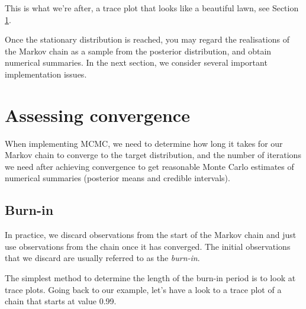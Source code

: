 \documentclass[
  12pt,
]{krantz}
\begin{document}
This is what we're after, a trace plot that looks like a beautiful lawn, see Section \ref{convergence-diag}.

Once the stationary distribution is reached, you may regard the realisations of the Markov chain as a sample from the posterior distribution, and obtain numerical summaries. In the next section, we consider several important implementation issues.

\section{Assessing convergence}\label{convergence-diag}

\begin{blackbox}
When implementing MCMC, we need to determine how long it takes for our Markov chain to converge to the target distribution, and the number of iterations we need after achieving convergence to get reasonable Monte Carlo estimates of numerical summaries (posterior means and credible intervals).

\end{blackbox}

\subsection{Burn-in}\label{burn-in}

In practice, we discard observations from the start of the Markov chain and just use observations from the chain once it has converged. The initial observations that we discard are usually referred to as the \emph{burn-in}.

The simplest method to determine the length of the burn-in period is to look at trace plots. Going back to our example, let's have a look to a trace plot of a chain that starts at value 0.99.
\end{document}
